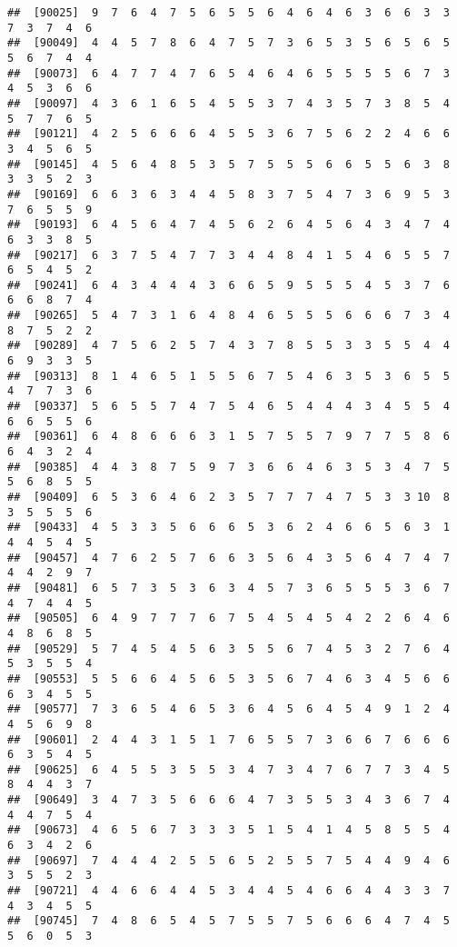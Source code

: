 \documentclass[
]{book}
\begin{document}
\begin{verbatim}
##  [90025]  9  7  6  4  7  5  6  5  5  6  4  6  4  6  3  6  6  3  3  7  3  7  4  6
##  [90049]  4  4  5  7  8  6  4  7  5  7  3  6  5  3  5  6  5  6  5  5  6  7  4  4
##  [90073]  6  4  7  7  4  7  6  5  4  6  4  6  5  5  5  5  6  7  3  4  5  3  6  6
##  [90097]  4  3  6  1  6  5  4  5  5  3  7  4  3  5  7  3  8  5  4  5  7  7  6  5
##  [90121]  4  2  5  6  6  6  4  5  5  3  6  7  5  6  2  2  4  6  6  3  4  5  6  5
##  [90145]  4  5  6  4  8  5  3  5  7  5  5  5  6  6  5  5  6  3  8  3  3  5  2  3
##  [90169]  6  6  3  6  3  4  4  5  8  3  7  5  4  7  3  6  9  5  3  7  6  5  5  9
##  [90193]  6  4  5  6  4  7  4  5  6  2  6  4  5  6  4  3  4  7  4  6  3  3  8  5
##  [90217]  6  3  7  5  4  7  7  3  4  4  8  4  1  5  4  6  5  5  7  6  5  4  5  2
##  [90241]  6  4  3  4  4  4  3  6  6  5  9  5  5  5  4  5  3  7  6  6  6  8  7  4
##  [90265]  5  4  7  3  1  6  4  8  4  6  5  5  5  6  6  6  7  3  4  8  7  5  2  2
##  [90289]  4  7  5  6  2  5  7  4  3  7  8  5  5  3  3  5  5  4  4  6  9  3  3  5
##  [90313]  8  1  4  6  5  1  5  5  6  7  5  4  6  3  5  3  6  5  5  4  7  7  3  6
##  [90337]  5  6  5  5  7  4  7  5  4  6  5  4  4  4  3  4  5  5  4  6  6  5  5  6
##  [90361]  6  4  8  6  6  6  3  1  5  7  5  5  7  9  7  7  5  8  6  6  4  3  2  4
##  [90385]  4  4  3  8  7  5  9  7  3  6  6  4  6  3  5  3  4  7  5  5  6  8  5  5
##  [90409]  6  5  3  6  4  6  2  3  5  7  7  7  4  7  5  3  3 10  8  3  5  5  5  6
##  [90433]  4  5  3  3  5  6  6  6  5  3  6  2  4  6  6  5  6  3  1  4  4  5  4  5
##  [90457]  4  7  6  2  5  7  6  6  3  5  6  4  3  5  6  4  7  4  7  4  4  2  9  7
##  [90481]  6  5  7  3  5  3  6  3  4  5  7  3  6  5  5  5  3  6  7  4  7  4  4  5
##  [90505]  6  4  9  7  7  7  6  7  5  4  5  4  5  4  2  2  6  4  6  4  8  6  8  5
##  [90529]  5  7  4  5  4  5  6  3  5  5  6  7  4  5  3  2  7  6  4  5  3  5  5  4
##  [90553]  5  5  6  6  4  5  6  5  3  5  6  7  4  6  3  4  5  6  6  6  3  4  5  5
##  [90577]  7  3  6  5  4  6  5  3  6  4  5  6  4  5  4  9  1  2  4  4  5  6  9  8
##  [90601]  2  4  4  3  1  5  1  7  6  5  5  7  3  6  6  7  6  6  6  6  3  5  4  5
##  [90625]  6  4  5  5  3  5  5  3  4  7  3  4  7  6  7  7  3  4  5  8  4  4  3  7
##  [90649]  3  4  7  3  5  6  6  6  4  7  3  5  5  3  4  3  6  7  4  4  4  7  5  4
##  [90673]  4  6  5  6  7  3  3  3  5  1  5  4  1  4  5  8  5  5  4  6  3  4  2  6
##  [90697]  7  4  4  4  2  5  5  6  5  2  5  5  7  5  4  4  9  4  6  3  5  5  2  3
##  [90721]  4  4  6  6  4  4  5  3  4  4  5  4  6  6  4  4  3  3  7  4  3  4  5  5
##  [90745]  7  4  8  6  5  4  5  7  5  5  7  5  6  6  6  4  7  4  5  5  6  0  5  3

\end{verbatim}
\end{document}
